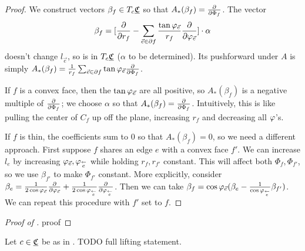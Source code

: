 \begin{proof}
We construct vectors $\beta_f \in T_c {\underline{\mathfrak{C}}}$ so that
$A_*(\beta_f) = {\frac{\partial}{\partial \Phi_f}}$.
The vector
\begin{equation}
\beta_f = [ {\frac{\partial}{\partial r_f}} - \sum_{\vec{e} \in \partial f} 
	\frac{\tan \varphi_{\vec{e}}}{r_f} {\frac{\partial}{\partial \varphi_{\vec{e}}}}] \cdot \alpha
\end{equation}
doesn't change $l_{\vec{e}}$,
so is in $T_c {\underline{\mathfrak{C}}}$
($\alpha$ to be determined).
Its pushforward under $A$ is simply
$A_*(\beta_f) = \frac{1}{r_f} \sum_{\vec{e}\in \partial f} \tan \varphi_{\vec{e}}
	{\frac{\partial}{\partial \Phi_f}}$.


If $f$ is a convex face, then the $\tan \varphi_{\vec{e}}$ are all positive,
so $A_*(\beta_f)$ is a negative multiple of ${\frac{\partial}{\partial \Phi_f}}$;
we choose $\alpha$ so that $A_*(\beta_f) = {\frac{\partial}{\partial \Phi_f}}$.
Intuitively, this is like
pulling the center of $C_f$ up off the plane, increasing $r_f$ and decreasing all
$\varphi$'s.


If $f$ is thin, the coefficients sum to 0 so that $A_*(\beta_f) = 0$,
so we need a different approach. First suppose $f$ shares an edge
$e$ with a convex face $f'$. We can increase $l_e$
by increasing $\varphi_{\vec{e}},\varphi_{\overset{\leftarrow}{e}}$
while holding $r_f,r_{f'}$ constant.
This will affect both $\Phi_f, \Phi_{f'}$,
so we use $\beta_{f'}$ to make $\Phi_{f'}$ constant.
More explicitly, consider
$\beta_e = \frac{1}{2\cos \varphi_{\vec{e}}} {\frac{\partial}{\partial \varphi_{\vec{e}}}}
+ \frac{1}{2\cos \varphi_{\overset{\leftarrow}{e}}} {\frac{\partial}{\partial \varphi_{\overset{\leftarrow}{e}}}}$.
Then we can take
$\beta_f = \cos \varphi_{\vec{e}}
	(\beta_e - \frac{1}{\cos \varphi_{\overset{\leftarrow}{e}}} \beta_{f'})$.
We can repeat this procedure with $f'$ set to $f$.
\end{proof}

\begin{proof}[Proof of ]
proof
\end{proof}


\begin{proposition}
Let $c\in {\underline{\mathfrak{C}}}$ be as in .
TODO full lifting statement.
\end{proposition}


